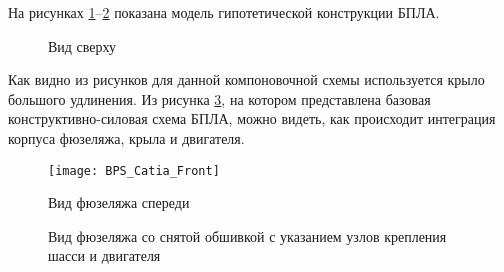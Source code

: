 На рисунках 
\ref{fig:BPS_Catia_Top}--\ref{fig:BPS_Catia_Front} показана модель гипотетической конструкции БПЛА.


\begin{figure}[H]
\centering
\def\svgwidth{0.9\textwidth}

\caption{Вид сверху}
\label{fig:BPS_Catia_Top}
\end{figure}



Как видно из рисунков для данной компоновочной схемы используется крыло большого удлинения. Из рисунка \ref{fig:BPS_Catia_WithoutSkin}, на котором представлена базовая конструктивно-силовая схема БПЛА, можно видеть, как происходит интеграция корпуса фюзеляжа, крыла и двигателя. 

\begin{figure}[H]
\centering
\texttt{[image: BPS\_Catia\_Front]}
\caption{Вид фюзеляжа спереди}
\label{fig:BPS_Catia_Front}
\end{figure}






\begin{figure}[H]
\centering
\def\svgwidth{0.9\textwidth}

\caption{Вид фюзеляжа со снятой обшивкой с указанием узлов крепления шасси и двигателя}
\label{fig:BPS_Catia_WithoutSkin}
\end{figure}

